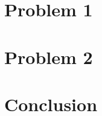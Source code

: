 \documentclass{article}
\begin{document}
\section{Problem 1}

\section{Problem 2}

\section{Conclusion}
\end{document}
